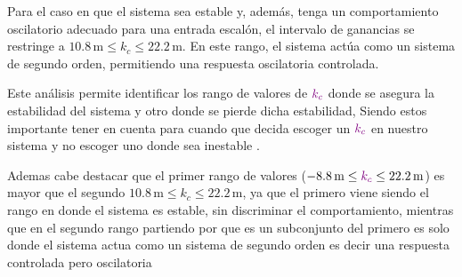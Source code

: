 Para el caso en que el sistema sea estable y, además, tenga un comportamiento oscilatorio adecuado para una entrada escalón, el intervalo de ganancias se restringe a \( 10.8 \, \text{m} \leq k_{c} \leq 22.2 \, \text{m} \). En este rango, el sistema actúa como un sistema de segundo orden, permitiendo una respuesta oscilatoria controlada.

Este análisis permite identificar los rango de valores de \(\mathbin{\color{violet}k_c}\) 
donde se asegura la estabilidad del sistema y otro donde se pierde dicha estabilidad, Siendo estos importante tener en cuenta para cuando que decida escoger un \(\mathbin{\color{violet}k_c}\) en nuestro sistema y no escoger uno donde sea inestable .


Ademas cabe destacar que el primer rango de valores (\( -8.8 \, \text{m} \leq \mathbin{\color{violet}k_c} \leq 22.2 \, \text{m} \)) es mayor que el segundo \( 10.8 \, \text{m} \leq k_{c} \leq 22.2 \, \text{m} \), ya que el primero viene siendo el rango en donde el sistema es estable, sin discriminar el comportamiento, mientras que en el segundo rango partiendo por que es un subconjunto del primero es solo donde el sistema actua como un sistema de segundo orden es decir una respuesta controlada pero oscilatoria